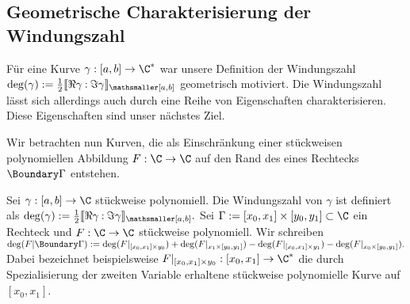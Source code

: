 \documentclass{mythesis}
\begin{document}
%


\subsection{Geometrische Charakterisierung der Windungszahl}

Für eine Kurve $\gamma: [a,b] \to \C^*$ war unsere Definition der Windungszahl
\begin{math}
    \deg(\gamma) := \frac{1}{2} \Index{[a,b]}{\Re \gamma}{\Im \gamma}
\end{math}
geometrisch motiviert.
Die Windungszahl lässt sich allerdings auch durch eine Reihe von Eigenschaften charakterisieren.
Diese Eigenschaften sind unser nächstes Ziel.

Wir betrachten nun Kurven, die als Einschränkung einer stückweisen polynomiellen Abbildung $F: \C \to \C$ auf den Rand des eines Rechtecks $\Boundary\Gamma$ entstehen.

\begin{definition} \label{thm:df:winding_number}
    Sei $\gamma: [a,b] \to \C$ stückweise polynomiell.
    Die Windungszahl von $\gamma$ ist definiert als
    \begin{math}
        \deg(\gamma) := \frac{1}{2} \Index{[a,b]}{\Re \gamma}{\Im \gamma}.
    \end{math}
    Sei $\Gamma := [x_0, x_1] \times [y_0, y_1] \subset \C$ ein Rechteck und $F: \C \to \C$ stückweise polynomiell.
    Wir schreiben
    \begin{math}[numbered] \label{eq:winding-number_boundary}
        \deg(F | \Boundary\Gamma) := \deg( F|_{[x_0,x_1]\times y_0} ) + \deg( F|_{x_1\times[y_0,y_1]} ) - \deg( F|_{[x_0,x_1]\times y_1} ) - \deg( F|_{x_0 \times [y_0, y_1]} ).
    \end{math}
    Dabei bezeichnet beispielsweise $F|_{[x_0,x_1]\times y_0}: [x_0, x_1] \to \C^*$ die durch Spezialisierung der zweiten Variable erhaltene stückweise polynomielle Kurve auf $[x_0, x_1]$.
\end{definition}
\end{document}
